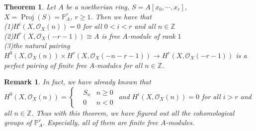 \documentclass{ctexart}
\newtheorem{remark}{Remark}[section]
\newtheorem{theorem}{Theorem}[section]
\newcommand{\proj}{\operatorname{Proj}}
\begin{document}
\begin{theorem}
    Let $A$ be a noetherian ring, $S= A[x_{0}, \cdots, x_{r}]$, $X = \proj(S) = \mathbb{P}_{A}^{r}$, $r \ge 1$.
    Then we have that \\ 
    (1)$H^{i}(X, \mathcal{O}_{X}(n)) = 0$ for all $0 < i < r$ and all $n\in \mathbb{Z}$ \\
    (2)$H^{r}(X, \mathcal{O}_{X}(-r - 1)) \cong A$ is free $A$-module of rank $1$ \\
    (3)the natural pairing $H^{0}(X, \mathcal{O}_{X}(n)) \times H^{r}(X, \mathcal{O}_{X}(-n - r - 1)) \longrightarrow H^{r}(X, \mathcal{O}_{X}(-r - 1))$ is a perfect pairing of finite free $A$-modules for all $n\in \mathbb{Z}$.
    \label{Theorem 7.6}
\end{theorem}
\begin{remark}
    In fact, we have already known that $H^{0}(X, \mathcal{O}_{X}(n)) =
    \left\{
        \begin{aligned}
            & S_{n} & n \ge 0 \\
            & 0 & n < 0
        \end{aligned}
    \right.$
    and $H^{i}(X, \mathcal{O}_{X}(n)) = 0$ for all $i > r$ and all $n\in \mathbb{Z}$.
    Thus with this theorem, we have figured out all the cohomological groups of $\mathbb{P}_{A}^{r}$.
    Especially, all of them are finite free $A$-modules.
\end{remark}
\end{document}
